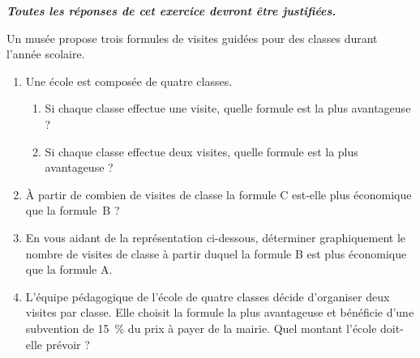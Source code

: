 \textbf{\textit{Toutes les réponses de cet exercice devront être justifiées.}}

\bigskip
Un musée propose trois formules de visites guidées pour des classes durant l’année scolaire. 

\medskip
{}

\medskip
\begin{enumerate}
	\item Une école est composée de quatre classes.
	\begin{enumerate}
		\item Si chaque classe effectue une visite, quelle formule est la plus avantageuse ? 
		\item Si chaque classe effectue deux visites, quelle formule est la plus avantageuse ?
	\end{enumerate}
	\item À partir de combien de visites de classe la formule C est-elle plus économique que la formule~B ?
	\item En vous aidant de la représentation ci-dessous, déterminer graphiquement le nombre de visites de classe à partir duquel la formule B est plus économique que la formule A.
	

	\item L'équipe pédagogique de l'école de quatre classes décide d'organiser deux visites par classe. Elle choisit la formule la plus avantageuse et bénéficie d’une subvention de 15~\% du prix à payer de la mairie. Quel montant l’école doit-elle prévoir ?
\end{enumerate}